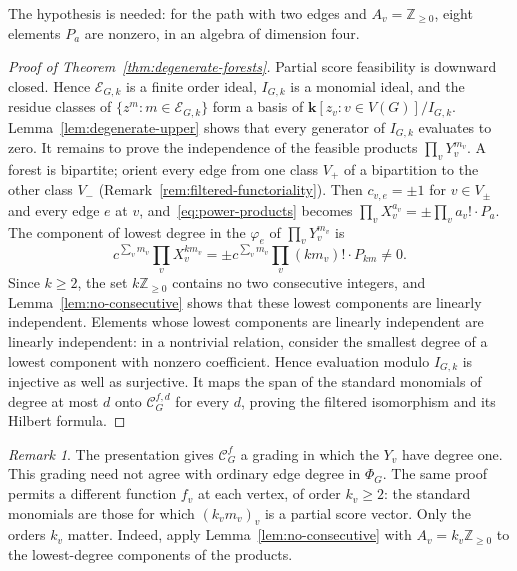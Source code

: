 \documentclass[reqno]{article}
\theoremstyle{plain} %
\theoremstyle{definition}
\theoremstyle{remark}
\newtheorem{remark}[theorem]{\sc Remark}
\newcommand{\Z}{{\mathbb{Z}}}
\newcommand{\K} {\mathbf{k}}
\newcommand {\CC}{\mathscr{C}}
\numberwithin{equation}{section}
\begin{document}
The hypothesis is needed: for the path with two edges and $A_v=\Z_{\ge0}$,
eight elements $P_a$ are nonzero, in an algebra of dimension four.

\begin{proof}[Proof of Theorem~\ref{thm:degenerate-forests}]
Partial score feasibility is downward closed. Hence $\mathcal E_{G,k}$
is a finite order ideal, $I_{G,k}$ is a monomial ideal, and the residue
classes of $\{z^m:m\in\mathcal E_{G,k}\}$ form a basis of
$\K[z_v:v\in V(G)]/I_{G,k}$.
Lemma~\ref{lem:degenerate-upper} shows that every generator of
$I_{G,k}$ evaluates to zero. It remains to prove the independence of
the feasible products $\prod_vY_v^{m_v}$. A forest is bipartite; orient every edge from one class
$V_+$ of a bipartition to the other class $V_-$
(Remark~\ref{rem:filtered-functoriality}). Then $c_{v,e}=\pm1$ for
$v\in V_\pm$ and every edge $e$ at $v$, and~\eqref{eq:power-products}
becomes $\prod_vX_v^{a_v}=\pm\prod_va_v!\cdot P_a$. The component of
lowest degree in the $\varphi_e$ of $\prod_vY_v^{m_v}$ is
\[
 c^{\sum_vm_v}\prod_vX_v^{km_v}=\pm c^{\sum_vm_v}\prod_v(km_v)!\cdot P_{km}\ne0.
\]
Since $k\ge2$, the set $k\Z_{\ge0}$ contains no two consecutive integers,
and Lemma~\ref{lem:no-consecutive} shows that these lowest components are
linearly independent. Elements whose lowest components are linearly
independent are linearly independent: in a nontrivial relation, consider
the smallest degree of a lowest component with nonzero coefficient.
Hence evaluation modulo $I_{G,k}$ is injective as well as surjective.
It maps the span of the standard monomials of degree at most $d$ onto
$\CC_G^{f,d}$ for every $d$, proving the filtered isomorphism and its
Hilbert formula.
\end{proof}

\begin{remark}\label{rem:degenerate-grading}
The presentation gives $\CC_G^f$ a grading in which the $Y_v$ have
degree one. This grading need not agree with ordinary edge degree in
$\Phi_G$. The same proof permits a different function $f_v$ at each
vertex, of order $k_v\ge2$: the standard monomials are those for which
$(k_vm_v)_v$ is a partial score vector. Only the orders $k_v$ matter.
Indeed, apply Lemma~\ref{lem:no-consecutive} with $A_v=k_v\Z_{\ge0}$
to the lowest-degree components of the products.
\end{remark}
\end{document}
